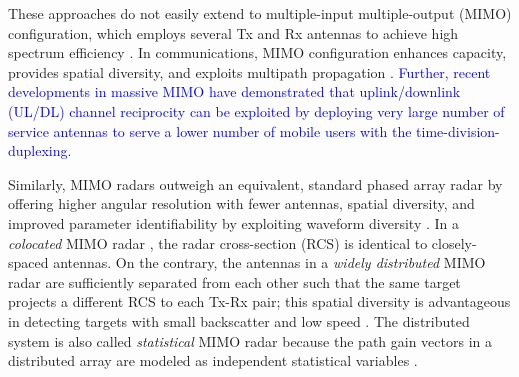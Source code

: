 \documentclass[10pt,journal]{IEEEtran}
\theoremstyle{definition}
\begin{document}
	These approaches do not easily extend \cite{alaee2020information,dokhanchi2020multi} to multiple-input multiple-output (MIMO) configuration, which employs several Tx and Rx antennas to achieve high spectrum efficiency \cite{tse2005fundamentals,haimovich2008mimo}. %
	In communications, MIMO configuration enhances capacity, provides spatial diversity, and exploits multipath propagation \cite{tse2005fundamentals}. \textcolor{blue}{Further, recent developments in massive MIMO \cite{Lops2020uplink,mishra2019toward} have demonstrated that uplink/downlink (UL/DL) channel reciprocity can be exploited by deploying very large number of service antennas to serve a lower number of mobile users with the time-division-duplexing.}
	
	Similarly, MIMO radars outweigh an equivalent, standard phased array radar by offering higher angular resolution with fewer antennas, spatial diversity, and improved parameter identifiability by exploiting waveform diversity \cite{haimovich2008mimo}. %
	In a \textit{colocated} MIMO radar \textcolor{red}{\cite{Eldar2020jointradarcomm,mishra2019cognitive}}, the radar cross-section (RCS) is identical to closely-spaced antennas. On the contrary, the antennas in a \textit{widely distributed} MIMO radar are sufficiently separated from each other such that the same target projects a different RCS to each Tx-Rx pair; this spatial diversity is advantageous in detecting targets with small backscatter and low speed \cite{hongbin_movingtarget,sun2019target}. The distributed system is also called \textit{statistical} MIMO radar because the path gain vectors in a distributed array are modeled as independent statistical variables \cite{hongbin_movingtarget,Jammer_game,NaghshTSP2017,sun2019target}. 
	
\end{document}
